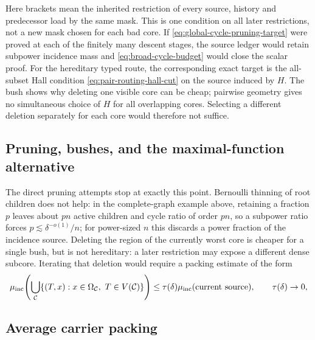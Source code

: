 \documentclass[11pt]{article}
\begin{document}
Here brackets mean the inherited restriction of every source, history and
predecessor load by the same mask.  This is one condition on all later
restrictions, not a new mask chosen for each bad core.  If
\eqref{eq:global-cycle-pruning-target} were proved at each of the finitely many
descent stages, the source ledger would retain subpower incidence mass and
\eqref{eq:broad-cycle-budget} would close the scalar proof.  For the hereditary
typed route, the corresponding exact target is the all-subset Hall condition
\eqref{eq:pair-routing-hall-cut} on the source induced by \(H\).  The bush
shows why deleting one visible core can be cheap; pairwise geometry gives no
simultaneous choice of \(H\) for all overlapping cores.  Selecting a different
deletion separately for each core would therefore not suffice.

\subsection{Pruning, bushes, and the maximal-function alternative}

The direct pruning attempts stop at exactly this point.  Bernoulli thinning of
root children does not help: in the complete-graph example above, retaining a
fraction \(p\) leaves about \(pn\) active children and cycle ratio of order
\(pn\), so a subpower ratio forces \(p\lesssim\delta^{-o(1)}/n\); for
power-sized \(n\) this discards a power fraction of the incidence source.
Deleting the region of the currently worst core is cheaper for a single bush,
but is not hereditary: a later restriction may expose a different dense
subcore.  Iterating that deletion would require a packing estimate of the form
\begin{equation}\label{eq:dense-core-deletion-packing}
 \mu_{\rm inc}\!\left(
   \bigcup_{\mathcal C}
   \{(T,x):x\in\Omega_{\mathcal C},\ T\in V(\mathcal C)\}
 \right)
 \le \tau(\delta)\mu_{\rm inc}(\text{current source}),
 \qquad \tau(\delta)\to0,
\end{equation}

\subsection{Average carrier packing}
\end{document}
